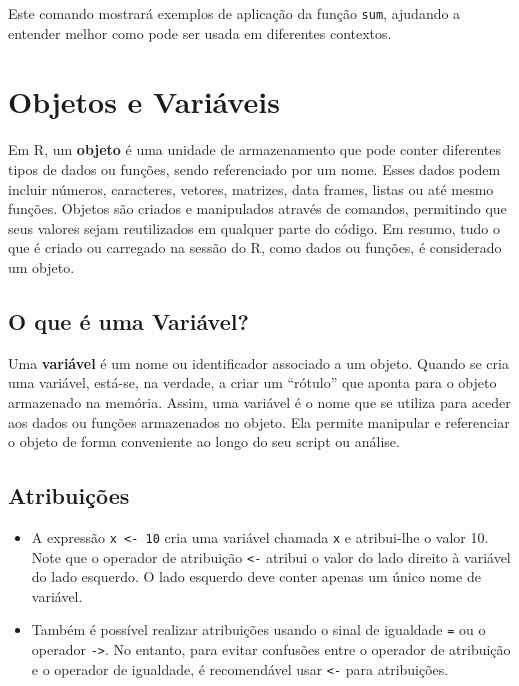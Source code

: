 \documentclass[
]{book}
\begin{document}
Este comando mostrará exemplos de aplicação da função \texttt{sum}, ajudando a
entender melhor como pode ser usada em diferentes contextos.

\section{Objetos e Variáveis}\label{objetos-e-variuxe1veis}

Em R, um \textbf{objeto} é uma unidade de armazenamento que pode conter
diferentes tipos de dados ou funções, sendo referenciado por um nome.
Esses dados podem incluir números, caracteres, vetores, matrizes, data
frames, listas ou até mesmo funções. Objetos são criados e manipulados
através de comandos, permitindo que seus valores sejam reutilizados em
qualquer parte do código. Em resumo, tudo o que é criado ou carregado na
sessão do R, como dados ou funções, é considerado um objeto.

\subsection{O que é uma Variável?}\label{o-que-uxe9-uma-variuxe1vel}

Uma \textbf{variável} é um nome ou identificador associado a um objeto.
Quando se cria uma variável, está-se, na verdade, a criar um ``rótulo''
que aponta para o objeto armazenado na memória. Assim, uma variável é o
nome que se utiliza para aceder aos dados ou funções armazenados no
objeto. Ela permite manipular e referenciar o objeto de forma
conveniente ao longo do seu script ou análise.

\subsection{Atribuições}\label{atribuiuxe7uxf5es}

\begin{itemize}
\item
  A expressão \texttt{x\ \textless{}-\ 10} cria uma variável chamada \texttt{x} e atribui-lhe o
  valor 10. Note que o operador de atribuição \texttt{\textless{}-} atribui o valor do
  lado direito à variável do lado esquerdo. O lado esquerdo deve
  conter apenas um único nome de variável.
\item
  Também é possível realizar atribuições usando o sinal de igualdade
  \texttt{=} ou o operador \texttt{-\textgreater{}}. No entanto, para evitar confusões entre o
  operador de atribuição e o operador de igualdade, é recomendável
  usar \texttt{\textless{}-} para atribuições.
\end{itemize}
\end{document}

